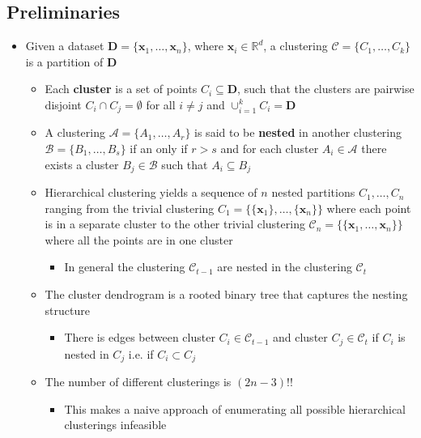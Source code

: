 \documentclass[11pt]{article}
\begin{document}
\subsection{Preliminaries}
\label{sec:org658e4ec}
\begin{itemize}
\item Given a dataset \(\mathbf D = \{ \pmb x_1, \dots, \pmb x_n \}\), where \(\pmb x_i \in \mathbb R^d\), a clustering \(\mathcal C = \{C_1, \dots, C_k\}\) is a partition of \(\mathbf D\)
\begin{itemize}
\item Each \textbf{cluster} is a set of points \(C_i \subseteq \mathbf D\), such that the clusters are pairwise disjoint \(C_i \cap C_j = \emptyset\) for all \(i \ne j\) and \(\cup_{i=1}^k C_i = \mathbf D\)
\item A clustering \(\mathcal A = \{ A_1, \dots, A_r\}\) is said to be \textbf{nested} in another clustering \(\mathcal B = \{B_1, \dots, B_s\}\) if an only if \(r>s\) and for each cluster \(A_i \in \mathcal A\) there exists a cluster \(B_j \in \mathcal B\) such that \(A_i \subseteq B_j\)
\item Hierarchical clustering yields a sequence of \(n\) nested partitions \(C_1, \dots, C_n\) ranging from the trivial clustering \(C_1 = \{\{\pmb x_1\}, \dots, \{\pmb x_n\}\}\) where each point is in a separate cluster to the other trivial clustering \(\mathcal C_n = \{\{\pmb x_1, \dots, \pmb x_n \}\}\) where all the points are in one cluster
\begin{itemize}
\item In general the clustering \(\mathcal C_{t-1}\) are nested in the clustering \(\mathcal C_t\)
\end{itemize}
\item The cluster dendrogram is a rooted binary tree that captures the nesting structure
\begin{itemize}
\item There is edges between cluster \(C_i \in \mathcal C_{t-1}\) and cluster \(C_j \in \mathcal C_t\) if \(C_i\) is nested in \(C_j\) i.e. if \(C_i \subset C_j\)
\end{itemize}
\item The number of different clusterings is \((2n-3)!!\) 
\begin{itemize}
\item This makes a naive approach of enumerating all possible hierarchical clusterings infeasible
\end{itemize}
\end{itemize}
\end{itemize}
\end{document}
